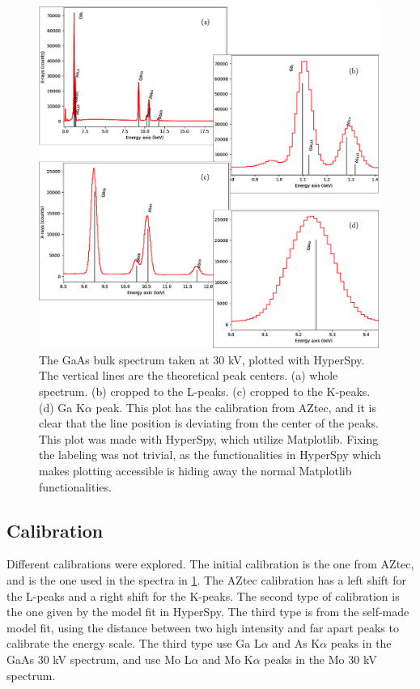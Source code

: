 \begin{figure}[p]
    \centering
    \includegraphics[width=0.99\textwidth]{figures/GaAs30kV_HS.png}
    \caption{
        The GaAs bulk spectrum taken at 30 kV, plotted with HyperSpy.
        The vertical lines are the theoretical peak centers.%
        (a) whole spectrum.
        (b) cropped to the L-peaks.
        (c) cropped to the K-peaks.
        (d) Ga K$\alpha$ peak.
        This plot has the calibration from AZtec, and it is clear that the line position is deviating from the center of the peaks.
        This plot was made with HyperSpy, which utilize Matplotlib.
        Fixing the labeling was not trivial, as the functionalities in HyperSpy which makes plotting accessible is hiding away the normal Matplotlib functionalities.
    }
    \label{fig:GaAs30kV_HS}
\end{figure}




\subsection{Calibration}
\label{sec:results:qualitative:calibration}

Different calibrations were explored.
The initial calibration is the one from AZtec, and is the one used in the spectra in \cref{fig:GaAs30kV_HS}.
The AZtec calibration has a left shift for the L-peaks and a right shift for the K-peaks.
The second type of calibration is the one given by the model fit in HyperSpy.
The third type is from the self-made model fit, using the distance between two high intensity and far apart peaks to calibrate the energy scale.
The third type use Ga L$\alpha$ and As K$\alpha$ peaks in the GaAs 30 kV spectrum, and use Mo L$\alpha$ and Mo K$\alpha$ peaks in the Mo 30 kV spectrum.

